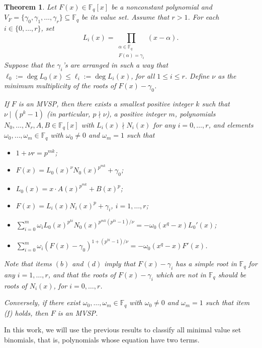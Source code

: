 \documentclass[preprint,12pt]{elsarticle}
\def\F{\mathbb{F}_q}
\newtheorem{theorem}{Theorem}[section]
\begin{document}
\begin{theorem}\label{MVSP-condition}
    Let $F(x) \in \mathbb{F}_q[x]$ be a nonconstant polynomial and $V_F = \{ \gamma_0, \gamma_1, \ldots, \gamma_r \} \subseteq \mathbb{F}_q$ be its value set. Assume that $r > 1$. For each $i \in \{0, \ldots, r\}$, set 
    $$L_i(x) = \prod_{\substack{\alpha \in \mathbb{F}_q\\F(\alpha) = \gamma_i}}(x - \alpha).$$
    Suppose that the $\gamma_i$'s are arranged in such a way that $\ell_0 := \deg L_0(x) \leq \ell_i := \deg L_i(x)$, for all $1 \leq i \leq r$. Define $\nu$ as the minimum multiplicity of the roots of $F(x) - \gamma_0$.

    If $F$ is an MVSP, then there exists a smallest positive integer $k$ such that $\nu \mid (p^k - 1)$ (in particular, $p \nmid \nu$), a positive integer $m$, polynomials $N_0, \ldots, N_r, A, B \in \mathbb{F}_q[x]$ with $L_i(x) \nmid N_i(x)$ for any $i = 0, \ldots, r$, and elements $\omega_0, \ldots, \omega_m \in \mathbb{F}_q$ with $\omega_0 \neq 0$ and $\omega_m = 1$ such that
    \begin{itemize}
        \item[(a)] $1 + \nu r = p^{mk}$;
        \item[(b)] $F(x) = L_0(x)^\nu N_0(x)^{p^{mk}} + \gamma_0$;
        \item[(c)] $L_0(x) = x \cdot A(x)^{p^{mk}} + B(x)^p$;
        \item[(d)] $F(x) = L_i(x)N_i(x)^p + \gamma_i$, $i = 1, \ldots, r$;
        \item[(e)] $\sum_{i=0}^m \omega_i L_0(x)^{p^{ki}} N_0(x)^{p^{mk}(p^{ki}-1)/\nu} = -\omega_0 (x^q - x) L_0'(x)$;
        \item[(f)] $\sum_{i=0}^m \omega_i (F(x) - \gamma_0)^{1+(p^{ki}-1)/\nu} = -\omega_0 (x^q - x) F'(x)$.
    \end{itemize}
    Note that items $(b)$ and $(d)$ imply that $F(x) - \gamma_i$ has a simple root in $\mathbb{F}_q$ for any $i = 1, \ldots, r$, and that the roots of $F(x) - \gamma_i$ which are not in $\mathbb{F}_q$ should be roots of $N_i(x)$, for $i = 0, \ldots, r$. 
    
    Conversely, if there exist $\omega_0, \ldots, \omega_m \in \mathbb{F}_q$ with $\omega_0 \neq 0$ and $\omega_m = 1$ such that item (f) holds, then $F$ is an MVSP.
\end{theorem}

In this work, we will use the previous results to classify all minimal value set binomials, that is, polynomials whose equation have two terms.\\
\end{document}
